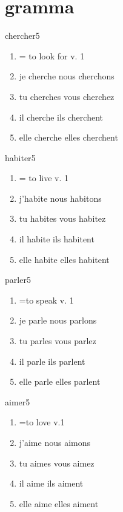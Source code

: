 \documentclass[./templates/main.tex]{subfiles}
\begin{document}
\section{gramma}
\begin{word}{chercher}{\myftipa{}}{5}\label{wo:chercher}
  \begin{enumerate}[label=(\arabic*)]
    \item = to look for v. 1
    \item je cherche nous cherchons
    \item tu cherches vous cherchez
    \item il cherche ils cherchent
    \item elle cherche elles cherchent
  \end{enumerate}
\end{word}
\begin{word}{habiter}{}{5}\label{wo:habiter}
  \begin{enumerate}[label=(\arabic*)]
    \item = to live v. 1
    \item j'habite nous habitons
    \item tu habites vous habitez
    \item il habite ils habitent
    \item elle habite elles habitent
  \end{enumerate}
\end{word}
\begin{word}{parler}{}{5}\label{wo:parler}
  \begin{enumerate}[label=(\arabic*)]
    \item =to speak v. 1
    \item je parle nous parlons
    \item tu parles vous parlez
    \item il parle ils parlent
    \item elle parle elles parlent
  \end{enumerate}
\end{word}
\begin{word}{aimer}{}{5}\label{wo:aimer}
  \begin{enumerate}[label=(\arabic*)]
    \item =to love v.1
    \item j'aime nous aimons
    \item tu aimes vous aimez
    \item il aime ils aiment
    \item elle aime elles aiment
  \end{enumerate}
\end{word}
\end{document}

